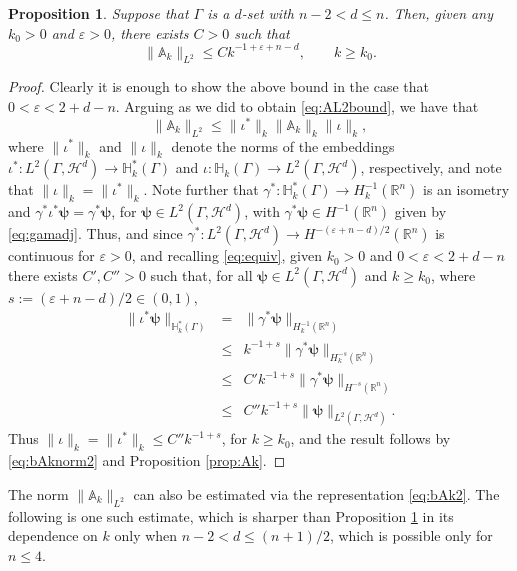 \documentclass{birkjour}
\newtheorem{proposition}[theorem]{Proposition}
\theoremstyle{definition}
\theoremstyle{remark}
\numberwithin{equation}{section}
\newcommand{\eps}{\varepsilon}
\newcommand{\R}{\mathbb{R}}
\newcommand{\cH}{\mathcal{H}}
\newcommand{\bA}{\mathbb{A}}
\newcommand{\bH}{\mathbb{H}}
\newcommand{\bpsi}{\boldsymbol{\psi}}
\begin{document}
\begin{proposition} \label{prop:L2bound} Suppose that $\Gamma$ is a $d$-set with $n-2<d\leq n$. Then, given any $k_0>0$ and $\eps>0$, there exists $C>0$ such that
$$
\|\bA_k\|_{L^2} \leq Ck^{-1+\eps+n-d}, \qquad k\geq k_0.
$$
\end{proposition}
\begin{proof} Clearly it is enough to show the above bound in the case that $0<\eps<2 +d-n$.
Arguing as we did to obtain \eqref{eq:AL2bound}, we have that
$$
\|\bA_k\|_{L^2} \leq \|\iota^*\|_k \|\bA_k\|_k \|\iota\|_k,
$$ 
where $\|\iota^*\|_k$ and $\|\iota\|_k$ denote the norms of the embeddings $\iota^*:L^2(\Gamma,\cH^d)\to \bH_k^*(\Gamma)$ and $\iota:\bH_k(\Gamma)\to L^2(\Gamma, \cH^d)$, respectively, and note that $\|\iota\|_k=\|\iota^*\|_k$. Note further that $\gamma^*:\bH_k^*(\Gamma)\to H^{-1}_k(\R^n)$ is an isometry and $\gamma^*\iota^* \bpsi =\gamma^*\bpsi$, for $\bpsi\in L^2(\Gamma,\cH^d)$, with $\gamma^*\bpsi\in H^{-1}(\R^n)$ given by \eqref{eq:gamadj}. Thus, and since $\gamma^*:L^2(\Gamma,\cH^d)\to H^{-(\eps+n-d)/2}(\R^n)$ is continuous for $\eps>0$, and recalling \eqref{eq:equiv}, given $k_0>0$ and $0<\eps<2+d-n$ there exists $C',C''>0$ such that, for all $\bpsi\in L^2(\Gamma, \cH^d)$ and $k\geq k_0$, where $s:= (\eps+n-d)/2 \in (0,1)$,
\begin{eqnarray*}
\|\iota^*\bpsi\|_{\bH_k^*(\Gamma)} &= &\|\gamma^*\bpsi\|_{H^{-1}_k(\R^n)}\\
&\leq &k^{-1+s}\|\gamma^*\bpsi\|_{H_k^{-s}(\R^n)}\\
& \leq &C' k^{-1+s}\|\gamma^*\bpsi\|_{H^{-s}(\R^n)}\\
& \leq &C'' k^{-1+s}\|\bpsi\|_{L^2(\Gamma,\cH^d)}.
\end{eqnarray*}
Thus $\|\iota\|_k = \|\iota^*\|_k \leq C'' k^{-1+s}$, for $k\geq k_0$, and the result follows by \eqref{eq:bAknorm2} and Proposition \ref{prop:Ak}.
\end{proof}

The norm $\|\bA_k\|_{L^2}$ can also be estimated via the representation \eqref{eq:bAk2}. The following is one such estimate, which is sharper than Proposition \ref{prop:L2bound} in its dependence on $k$ only when $n-2<d\leq (n+1)/2$, which is possible only for $n\leq 4$.
\end{document}
